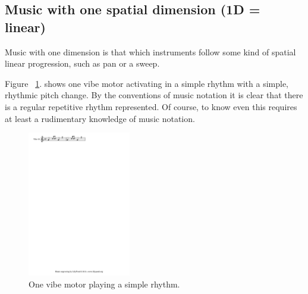\documentclass[a4paper, twocolumn]{article}
\begin{document}
\subsection{Music with one spatial dimension (1D = linear)}
Music with one dimension is that which instruments follow some kind of spatial linear progression, such as pan or a sweep. 

Figure ~\ref{fig:arrowsMoving00}. shows one vibe motor activating in a simple rhythm with a simple, rhythmic pitch change. By the conventions of music notation it is clear that there is a regular repetitive rhythm represented. Of course, to know even this requires at least a rudimentary knowledge of music notation. 




\begin{figure}[htb]
    \begin{center}
        \includegraphics[width=0.4\textwidth]{graphics/arrowsMoving-00.pdf}
    \end{center}
    \caption{One vibe motor playing a simple rhythm.\label{fig:arrowsMoving00}}
\end{figure}
\end{document}

